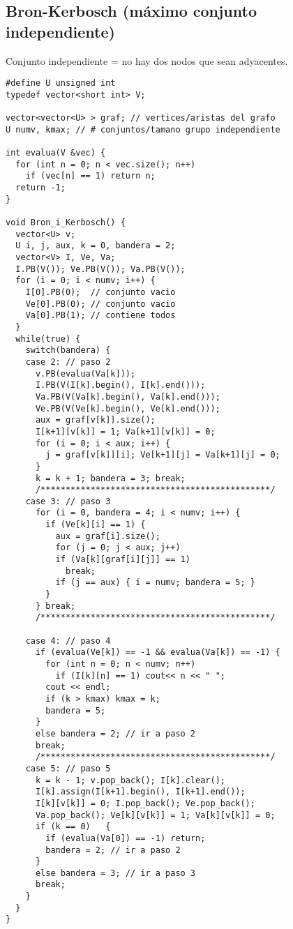 \documentclass[10pt, a4, oneside]{article}
\begin{document}
\subsection{Bron-Kerbosch (máximo conjunto independiente)}
Conjunto independiente = no hay dos nodos que sean adyacentes.
\begin{verbatim}
#define U unsigned int
typedef vector<short int> V;

vector<vector<U> > graf; // vertices/aristas del grafo
U numv, kmax; // # conjuntos/tamano grupo independiente

int evalua(V &vec) {
  for (int n = 0; n < vec.size(); n++)
    if (vec[n] == 1) return n;
  return -1;
}

void Bron_i_Kerbosch() {
  vector<U> v;
  U i, j, aux, k = 0, bandera = 2;
  vector<V> I, Ve, Va;
  I.PB(V()); Ve.PB(V()); Va.PB(V());
  for (i = 0; i < numv; i++) {
    I[0].PB(0);  // conjunto vacio
    Ve[0].PB(0); // conjunto vacio
    Va[0].PB(1); // contiene todos
  } 
  while(true) {
    switch(bandera) {
    case 2: // paso 2
      v.PB(evalua(Va[k]));
      I.PB(V(I[k].begin(), I[k].end()));
      Va.PB(V(Va[k].begin(), Va[k].end()));
      Ve.PB(V(Ve[k].begin(), Ve[k].end()));
      aux = graf[v[k]].size();
      I[k+1][v[k]] = 1; Va[k+1][v[k]] = 0;      
      for (i = 0; i < aux; i++) {
        j = graf[v[k]][i]; Ve[k+1][j] = Va[k+1][j] = 0;
      }
      k = k + 1; bandera = 3; break;
      /**********************************************/          
    case 3: // paso 3
      for (i = 0, bandera = 4; i < numv; i++) {
        if (Ve[k][i] == 1) {
          aux = graf[i].size();
          for (j = 0; j < aux; j++)
          if (Va[k][graf[i][j]] == 1) 
            break;
          if (j == aux) { i = numv; bandera = 5; }
        }
      } break;
      /**********************************************/

    case 4: // paso 4
      if (evalua(Ve[k]) == -1 && evalua(Va[k]) == -1) {
        for (int n = 0; n < numv; n++)
          if (I[k][n] == 1) cout<< n << " ";
        cout << endl;
        if (k > kmax) kmax = k;
        bandera = 5;
      }
      else bandera = 2; // ir a paso 2
      break;
      /**********************************************/
    case 5: // paso 5
      k = k - 1; v.pop_back(); I[k].clear();
      I[k].assign(I[k+1].begin(), I[k+1].end());
      I[k][v[k]] = 0; I.pop_back(); Ve.pop_back();
      Va.pop_back(); Ve[k][v[k]] = 1; Va[k][v[k]] = 0;
      if (k == 0)   {
        if (evalua(Va[0]) == -1) return;
        bandera = 2; // ir a paso 2
      }
      else bandera = 3; // ir a paso 3
      break;
    }
  }     
}


\end{verbatim}
\end{document}
